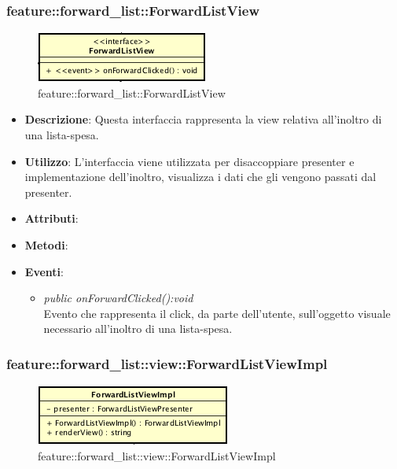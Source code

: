 \subsubsection{feature::forward\_list::ForwardListView}

\label{feature::forward_list::ForwardListView}
\begin{figure}[ht]
	\centering
	\includegraphics[scale=0.5]{Sezioni/SottosezioniST/img/app/ForwardListView.png}
	\caption{feature::forward\_list::ForwardListView}
\end{figure}

\begin{itemize}
\item \textbf{Descrizione}: Questa interfaccia rappresenta la view relativa all'inoltro di una lista-spesa.
\item \textbf{Utilizzo}: L'interfaccia viene utilizzata per disaccoppiare presenter e implementazione dell'inoltro, visualizza i dati che gli vengono passati dal presenter.
\item \textbf{Attributi}: 
\item \textbf{Metodi}:
\item \textbf{Eventi}:
\begin{itemize}
\item \textit{public onForwardClicked():void}\\
	Evento che rappresenta il click, da parte dell'utente, sull'oggetto visuale necessario all'inoltro di una lista-spesa.
\end{itemize}
\end{itemize}

\subsubsection{feature::forward\_list::view::ForwardListViewImpl}

\label{feature::forward_list::view::ForwardListViewImpl}
\begin{figure}[ht]
	\centering
	\includegraphics[scale=0.5]{Sezioni/SottosezioniST/img/app/ForwardListViewImpl.png}
	\caption{feature::forward\_list::view::ForwardListViewImpl}
\end{figure}

